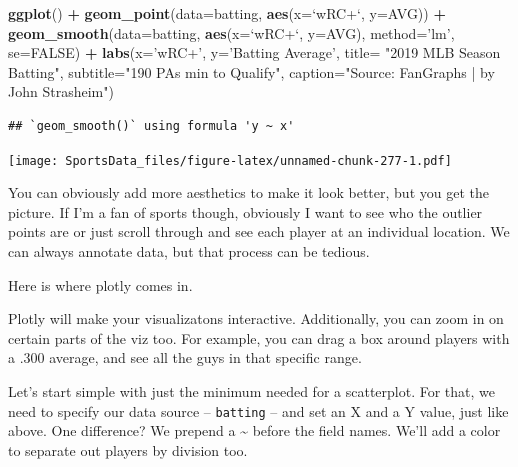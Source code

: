 \documentclass[]{book}
\newenvironment{Shaded}{\begin{snugshade}}{\end{snugshade}}
\newcommand{\DataTypeTok}[1]{\textcolor[rgb]{0.13,0.29,0.53}{#1}}
\newcommand{\KeywordTok}[1]{\textcolor[rgb]{0.13,0.29,0.53}{\textbf{#1}}}
\newcommand{\NormalTok}[1]{#1}
\newcommand{\OperatorTok}[1]{\textcolor[rgb]{0.81,0.36,0.00}{\textbf{#1}}}
\newcommand{\OtherTok}[1]{\textcolor[rgb]{0.56,0.35,0.01}{#1}}
\newcommand{\StringTok}[1]{\textcolor[rgb]{0.31,0.60,0.02}{#1}}
\begin{document}
\begin{Shaded}
\begin{Highlighting}[]
\KeywordTok{ggplot}\NormalTok{() }\OperatorTok{+}
\StringTok{  }\KeywordTok{geom_point}\NormalTok{(}\DataTypeTok{data=}\NormalTok{batting, }\KeywordTok{aes}\NormalTok{(}\DataTypeTok{x=}\StringTok{`}\DataTypeTok{wRC+}\StringTok{`}\NormalTok{, }\DataTypeTok{y=}\NormalTok{AVG)) }\OperatorTok{+}
\StringTok{  }\KeywordTok{geom_smooth}\NormalTok{(}\DataTypeTok{data=}\NormalTok{batting, }\KeywordTok{aes}\NormalTok{(}\DataTypeTok{x=}\StringTok{`}\DataTypeTok{wRC+}\StringTok{`}\NormalTok{, }\DataTypeTok{y=}\NormalTok{AVG), }\DataTypeTok{method=}\StringTok{'lm'}\NormalTok{, }\DataTypeTok{se=}\OtherTok{FALSE}\NormalTok{) }\OperatorTok{+}
\StringTok{  }\KeywordTok{labs}\NormalTok{(}\DataTypeTok{x=}\StringTok{'wRC+'}\NormalTok{, }\DataTypeTok{y=}\StringTok{'Batting Average'}\NormalTok{, }\DataTypeTok{title=} \StringTok{"2019 MLB Season Batting"}\NormalTok{, }\DataTypeTok{subtitle=}\StringTok{"190 PAs min to Qualify"}\NormalTok{, }\DataTypeTok{caption=}\StringTok{"Source:  FanGraphs | by John Strasheim"}\NormalTok{)}
\end{Highlighting}
\end{Shaded}

\begin{verbatim}
## `geom_smooth()` using formula 'y ~ x'
\end{verbatim}

\texttt{[image: SportsData\_files/figure-latex/unnamed-chunk-277-1.pdf]}

You can obviously add more aesthetics to make it look better, but you get the picture. If I'm a fan of sports though, obviously I want to see who the outlier points are or just scroll through and see each player at an individual location. We can always annotate data, but that process can be tedious.

Here is where plotly comes in.

Plotly will make your visualizatons interactive. Additionally, you can zoom in on certain parts of the viz too. For example, you can drag a box around players with a .300 average, and see all the guys in that specific range.

Let's start simple with just the minimum needed for a scatterplot. For that, we need to specify our data source -- \texttt{batting} -- and set an X and a Y value, just like above. One difference? We prepend a \textasciitilde{} before the field names. We'll add a color to separate out players by division too.
\end{document}

